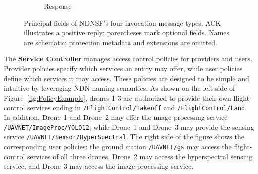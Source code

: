 \begin{figure}[t]
\begin{minipage}[c]{0.35\textwidth}
\begin{subfigure}[t]{0.49\linewidth}
    \caption{Response}
    \end{subfigure}

\caption{Principal fields of NDNSF's four invocation message types. ACK illustrates a positive reply; parentheses mark optional fields. Names are schematic; protection metadata and extensions are omitted.}
\label{fig:ndnsf-message-formats}
\end{minipage}
\end{figure}


The \textbf{Service Controller} manages access control policies for providers and users. Provider policies specify which services an entity may offer, while user policies define which services it may access. These policies are designed to be simple and intuitive by leveraging NDN naming semantics. As shown on the left side of Figure~\ref{fig:PolicyExample}, drones 1-3 are authorized to provide their own flight-control services ending in \texttt{/FlightControl/Takeoff} and \texttt{/FlightControl/Land}. In addition, Drone~1 and Drone~2 may offer the image-processing service \texttt{/UAVNET/ImageProc/YOLO12}, while Drone~1 and Drone~3 may provide the sensing service \texttt{/UAVNET/Sensor/HyperSpectral}. The right side of the figure shows the corresponding user policies: the ground station \texttt{/UAVNET/gs} may access the flight-control services of all three drones, Drone~2 may access the hyperspectral sensing service, and Drone~3 may access the image-processing service.

